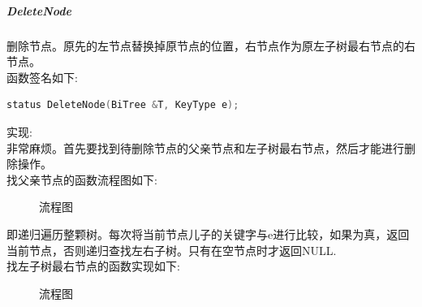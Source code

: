 \documentclass[supercite]{Experimental_Report}
\theoremstyle{definition}
\begin{document}
\subparagraph{DeleteNode}
\noindent
删除节点。原先的左节点替换掉原节点的位置，右节点作为原左子树最右节点的右节点。 \\
函数签名如下:
\begin{lstlisting}[language=C++, frame=single]
status DeleteNode(BiTree &T, KeyType e);
\end{lstlisting}
实现: \\
非常麻烦。首先要找到待删除节点的父亲节点和左子树最右节点，然后才能进行删除操作。 \\
找父亲节点的函数流程图如下:
\begin{figure}[H]
	\centering
	\centering
	\caption{流程图}
	\label{fig6-99}
\end{figure}
即递归遍历整颗树。每次将当前节点儿子的关键字与e进行比较，如果为真，返回当前节点，否则递归查找左右子树。只有在空节点时才返回NULL. \\
\clearpage
找左子树最右节点的函数实现如下:
\begin{figure}[H]
	\centering
	\centering
	\caption{流程图}
	\label{fig6-100}
\end{figure}
\end{document}
